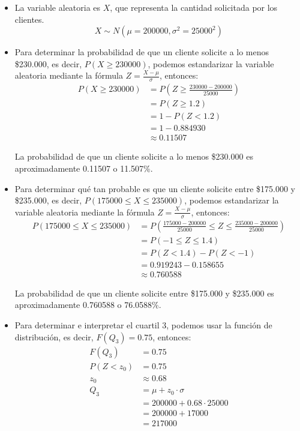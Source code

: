 \documentclass{article}
\theoremstyle{definition}
\theoremstyle{plain}
\theoremstyle{remark}
\begin{document}
\begin{itemize}
\item La variable aleatoria es $X$, que representa la cantidad solicitada por los clientes.
\[
X \sim N(\mu = 200000, \sigma^2 = 25000^2)
\]

\item Para determinar la probabilidad de que un cliente solicite a lo menos \$230.000, es decir, $P(X \geq 230000)$, podemos estandarizar la variable aleatoria mediante la fórmula $Z = \frac{X - \mu}{\sigma}$, entonces:
\begin{align*}
P(X \geq 230000) &= P\left(Z \geq \frac{230000 - 200000}{25000}\right) \\
&= P(Z \geq 1.2) \\
&= 1 - P(Z < 1.2) \\
&= 1 - 0.884930 \\
&\approx 0.11507
\end{align*}

La probabilidad de que un cliente solicite a lo menos \$230.000 es aproximadamente 0.11507 o 11.507\%.

\item Para determinar qué tan probable es que un cliente solicite entre \$175.000 y \$235.000, es decir, $P(175000 \leq X \leq 235000)$, podemos estandarizar la variable aleatoria mediante la fórmula $Z = \frac{X - \mu}{\sigma}$, entonces:
\begin{align*}
P(175000 \leq X \leq 235000) &= P\left(\frac{175000 - 200000}{25000} \leq Z \leq \frac{235000 - 200000}{25000}\right) \\
&= P(-1 \leq Z \leq 1.4) \\
&= P(Z < 1.4) - P(Z < -1) \\
&= 0.919243 - 0.158655 \\
&\approx 0.760588
\end{align*}

La probabilidad de que un cliente solicite entre \$175.000 y \$235.000 es aproximadamente 0.760588 o 76.0588\%.

\item Para determinar e interpretar el cuartil 3, podemos usar la función de distribución, es decir, $F(Q_3) = 0.75$, entonces:
\begin{align*}
F(Q_3) &= 0.75 \\
P(Z < z_0) &= 0.75 \\
z_0 &\approx 0.68 \\
Q_3 &= \mu + z_0 \cdot \sigma \\
&= 200000 + 0.68 \cdot 25000 \\
&= 200000 + 17000 \\
&= 217000
\end{align*}


\end{itemize}
\end{document}

